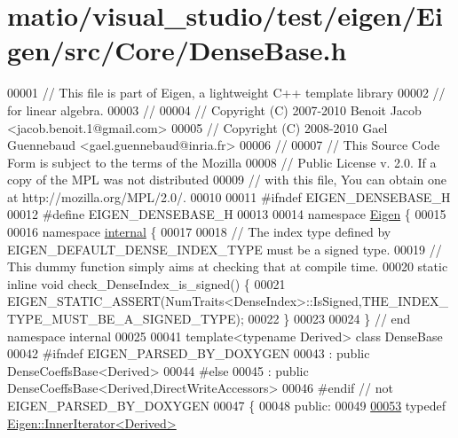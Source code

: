 \hypertarget{matio_2visual__studio_2test_2eigen_2_eigen_2src_2_core_2_dense_base_8h_source}{}\section{matio/visual\+\_\+studio/test/eigen/\+Eigen/src/\+Core/\+Dense\+Base.h}
\label{matio_2visual__studio_2test_2eigen_2_eigen_2src_2_core_2_dense_base_8h_source}

\begin{DoxyCode}
00001 \textcolor{comment}{// This file is part of Eigen, a lightweight C++ template library}
00002 \textcolor{comment}{// for linear algebra.}
00003 \textcolor{comment}{//}
00004 \textcolor{comment}{// Copyright (C) 2007-2010 Benoit Jacob <jacob.benoit.1@gmail.com>}
00005 \textcolor{comment}{// Copyright (C) 2008-2010 Gael Guennebaud <gael.guennebaud@inria.fr>}
00006 \textcolor{comment}{//}
00007 \textcolor{comment}{// This Source Code Form is subject to the terms of the Mozilla}
00008 \textcolor{comment}{// Public License v. 2.0. If a copy of the MPL was not distributed}
00009 \textcolor{comment}{// with this file, You can obtain one at http://mozilla.org/MPL/2.0/.}
00010 
00011 \textcolor{preprocessor}{#ifndef EIGEN\_DENSEBASE\_H}
00012 \textcolor{preprocessor}{#define EIGEN\_DENSEBASE\_H}
00013 
00014 \textcolor{keyword}{namespace }\hyperlink{namespace_eigen}{Eigen} \{
00015 
00016 \textcolor{keyword}{namespace }\hyperlink{namespaceinternal}{internal} \{
00017   
00018 \textcolor{comment}{// The index type defined by EIGEN\_DEFAULT\_DENSE\_INDEX\_TYPE must be a signed type.}
00019 \textcolor{comment}{// This dummy function simply aims at checking that at compile time.}
00020 \textcolor{keyword}{static} \textcolor{keyword}{inline} \textcolor{keywordtype}{void} check\_DenseIndex\_is\_signed() \{
00021   EIGEN\_STATIC\_ASSERT(NumTraits<DenseIndex>::IsSigned,THE\_INDEX\_TYPE\_MUST\_BE\_A\_SIGNED\_TYPE); 
00022 \}
00023 
00024 \} \textcolor{comment}{// end namespace internal}
00025   
00041 \textcolor{keyword}{template}<\textcolor{keyword}{typename} Derived> \textcolor{keyword}{class }DenseBase
00042 #ifndef EIGEN\_PARSED\_BY\_DOXYGEN
00043   : \textcolor{keyword}{public} DenseCoeffsBase<Derived>
00044 \textcolor{preprocessor}{#else}
00045   : \textcolor{keyword}{public} DenseCoeffsBase<Derived,DirectWriteAccessors>
00046 \textcolor{preprocessor}{#endif // not EIGEN\_PARSED\_BY\_DOXYGEN}
00047 \{
00048   \textcolor{keyword}{public}:
00049 
\hyperlink{group___core___module_a4dc102b445d8fb48a28dfcd22323f649}{00053}     \textcolor{keyword}{typedef} \hyperlink{class_eigen_1_1_inner_iterator}{Eigen::InnerIterator<Derived>} 

\end{DoxyCode}
